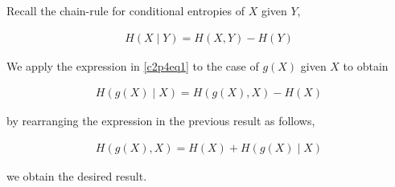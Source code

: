 \documentclass[ClusteringConnectionsMAIN.tex]{subfiles}
\begin{document}
	
	
  Recall the chain-rule for conditional entropies of $X$ given $Y$,

\begin{align}  \label{c2p4eq1}
H \left( X \mid Y \right) = H \left( X, Y \right) - H \left( Y \right)  \tag{2.4-1}
\end{align}

We apply the expression in \ref{c2p4eq1} to the case of $g \left( X \right)$ given $X$ to obtain

\begin{align} 
H \left( g \left( X \right) \mid X \right) = H \left( g \left( X \right), X \right) - H \left( X \right) 
\end{align}

by rearranging the expression in the previous result as follows,

\begin{align} \label{c2p4eq2} 
H \left( g \left( X \right), X \right) = H \left( X \right) + H \left( g \left( X \right) \mid X \right)  \tag{2.4-2}
\end{align}

we obtain the desired result.
\end{document}
